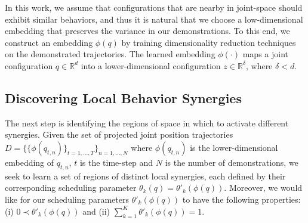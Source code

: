 \documentclass[letterpaper, 10 pt, conference,fleqn]{ieeeconf}
\begin{document}
In this work, we assume that configurations that are nearby in joint-space should exhibit similar behaviors, and thus it is natural that we choose a low-dimensional embedding that preserves the variance in our demonstrations. To this end, we construct an embedding $\phi(q)$ by training dimensionality reduction techniques on the demonstrated trajectories. The learned embedding $\phi(\cdot)$ maps a joint configuration $q \in \mathbb{R}^d$ into a lower-dimensional configuration $z \in \mathbb{R}^\delta$, where $\delta < d$.

\nocite{*}

\subsection{Discovering Local Behavior Synergies}
The next step is identifying the regions of space in which to activate different synergies. Given the set of projected joint position trajectories $D=\{\{\phi(q_{t,n})\}_{t=1,\dots, T}\}_{n=1,\dots,N}$ where $\phi(q_{t,n})$ is the lower-dimensional embedding of $q_{t,n}$, $t$ is the time-step and $N$ is the number of demonstrations, we seek to learn a set of regions of distinct local synergies, each defined by their corresponding scheduling parameter $\theta_k(q) = \theta'_k(\phi(q))$. Moreover, we would like for our scheduling parameters $\theta'_k(\phi(q))$ to have the following properties: (i) $0 \prec \theta'_k(\phi(q))$ and (ii) $\sum_{k=1}^{K}\theta'_k(\phi(q)) = 1$.
 
\end{document}
